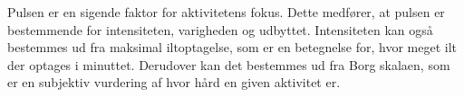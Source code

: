 Pulsen er en sigende faktor for aktivitetens fokus. Dette medfører, at pulsen er bestemmende for intensiteten, varigheden og udbyttet. Intensiteten kan også bestemmes ud fra maksimal iltoptagelse, som er en betegnelse for, hvor meget ilt der optages i minuttet. Derudover kan det bestemmes ud fra Borg skalaen, som er en subjektiv vurdering af hvor hård en given aktivitet er. \citep{Kiens2007}




